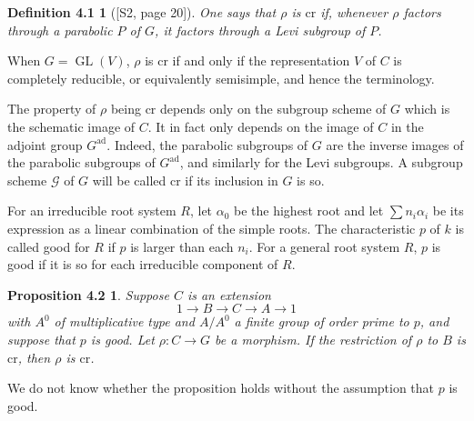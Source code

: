 \documentclass[11pt]{article}
\newcommand{\GL}{\operatorname{GL}}
\newtheorem*{definition41}{Definition 4.1}
\newtheorem*{proposition42}{Proposition 4.2}
\begin{document}
\begin{definition41}[{[S2, page 20]}]
One says that \(\rho\) is \(\mathrm{cr}\) if, whenever \(\rho\) factors through a
parabolic \(P\) of \(G\), it factors through a Levi subgroup of \(P\).
\end{definition41}

When \(G=\GL(V)\), \(\rho\) is \(\mathrm{cr}\) if and only if the representation \(V\)
of \(C\) is completely reducible, or equivalently semisimple, and hence the terminology.

The property of \(\rho\) being \(\mathrm{cr}\) depends only on the subgroup scheme of
\(G\) which is the schematic image of \(C\). It in fact only depends on the image of
\(C\) in the adjoint group \(G^{\mathrm{ad}}\). Indeed, the parabolic subgroups of \(G\)
are the inverse images of the parabolic subgroups of \(G^{\mathrm{ad}}\), and similarly
for the Levi subgroups. A subgroup scheme \(\mathcal G\) of \(G\) will be called
\(\mathrm{cr}\) if its inclusion in \(G\) is so.

For an irreducible root system \(R\), let \(\alpha_0\) be the highest root and let
\(\sum n_i\alpha_i\) be its expression as a linear combination of the simple roots. The
characteristic \(p\) of \(k\) is called good for \(R\) if \(p\) is larger than each
\(n_i\). For a general root system \(R\), \(p\) is good if it is so for each irreducible
component of \(R\).

\begin{proposition42}
Suppose \(C\) is an extension
\begin{equation}
  1\longrightarrow B\longrightarrow C\longrightarrow A\longrightarrow 1
  \tag{4.2.1}
\end{equation}
with \(A^0\) of multiplicative type and \(A/A^0\) a finite group of order prime to
\(p\), and suppose that \(p\) is good. Let \(\rho:C\to G\) be a morphism. If the
restriction of \(\rho\) to \(B\) is \(\mathrm{cr}\), then \(\rho\) is \(\mathrm{cr}\).
\end{proposition42}

We do not know whether the proposition holds without the assumption that \(p\) is good.
\end{document}
